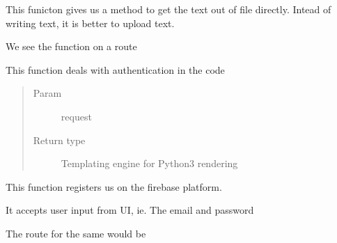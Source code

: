 \documentclass[letterpaper,10pt,english]{sphinxmanual}
\begin{document}

\begin{fulllineitems}
\label{\detokenize{main:main.evaluateFile}}
This funicton gives us a method to get the text out of file directly. Intead of writing text, it is better to upload text.

We see the function on a route 

\end{fulllineitems}


\begin{fulllineitems}
\label{\detokenize{main:main.firebase_login}}
This function deals with authentication in the code
\begin{quote}\begin{description}
\item[{Param}] \leavevmode
request

\item[{Return type}] \leavevmode

Templating engine for Python3 rendering

\begin{sphinxVerbatim}[commandchars=\\\{\}]
  
\end{sphinxVerbatim}


\end{description}\end{quote}

\end{fulllineitems}


\begin{fulllineitems}
\label{\detokenize{main:main.firebase_register}}
This function registers us on the firebase platform.

It accepts user input from UI, ie. The email and password

The route for the same would be 

\end{fulllineitems}
\end{document}
